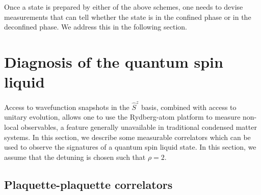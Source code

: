 \documentclass[twocolumn,superscriptaddress,amsmath,amssymb,aps,prx,nofootinbib]{revtex4-2}
\begin{document}
Once a state is prepared by either of the above schemes, one needs to devise measurements that can tell whether the state is in the confined phase or in the deconfined phase. We address this in the following section.

\section{Diagnosis of the quantum spin liquid}\label{sec:diagnostics}
Access to wavefunction snapshots in the $\hat{S}^z$ basis, combined with access to unitary evolution, allows one to use the Rydberg-atom platform to measure non-local observables, a feature generally unavailable in traditional condensed matter systems. In this section, we describe some measurable correlators which can be used to observe the signatures of a quantum spin liquid state. In this section, we  assume that the detuning is chosen such that $\rho = 2$.



\subsection{Plaquette-plaquette correlators}
\end{document}

